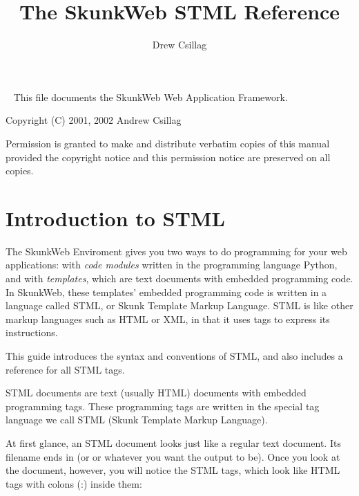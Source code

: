 \documentclass{manual}
\title{The SkunkWeb STML Reference}
\author{Drew Csillag}
\begin{document}
\newcommand{\argdescitem}[1]{\hspace\labelsep
                                \normalfont\ttfamily #1\ }
\newenvironment{argdesc}{\begin{list}{}{
        \renewcommand{\makelabel}{\argdescitem}
}
}{\end{list}}

\newcommand{\doref}[1]{(see section \ref{#1}, page \pageref{#1})}
\maketitle
\ 
\vfill 
\noindent
This file documents the SkunkWeb Web Application Framework.

\noindent
Copyright (C) 2001, 2002 Andrew Csillag

\noindent
Permission is granted to make and distribute verbatim copies of
this manual provided the copyright notice and this permission notice
are preserved on all copies.


\tableofcontents

\chapter{Introduction to STML}
\label{stmlrefintro}
The SkunkWeb Enviroment gives you two ways to do programming for your
web applications: with \emph{code modules} written in the programming
language Python, and with \emph{templates}, which are text documents
with embedded programming code. In SkunkWeb, these templates' embedded
programming code is written in a language called STML, or Skunk
Template Markup Language. STML is like other markup languages such as
HTML or XML, in that it uses tags to express its instructions.

This guide introduces the
syntax and conventions of STML, and also includes a reference
for all STML tags.

STML documents are text (usually HTML) documents with 
embedded programming tags. These programming tags are 
written in the special tag language we call STML 
(Skunk Template Markup Language).

At first glance, an STML document looks just like 
a regular text document. Its filename ends in 
 (or  or whatever you want the 
output to be). Once you look at the document, however, 
you will notice the STML tags, which look like HTML 
tags with colons (:) inside them:
\end{document}
